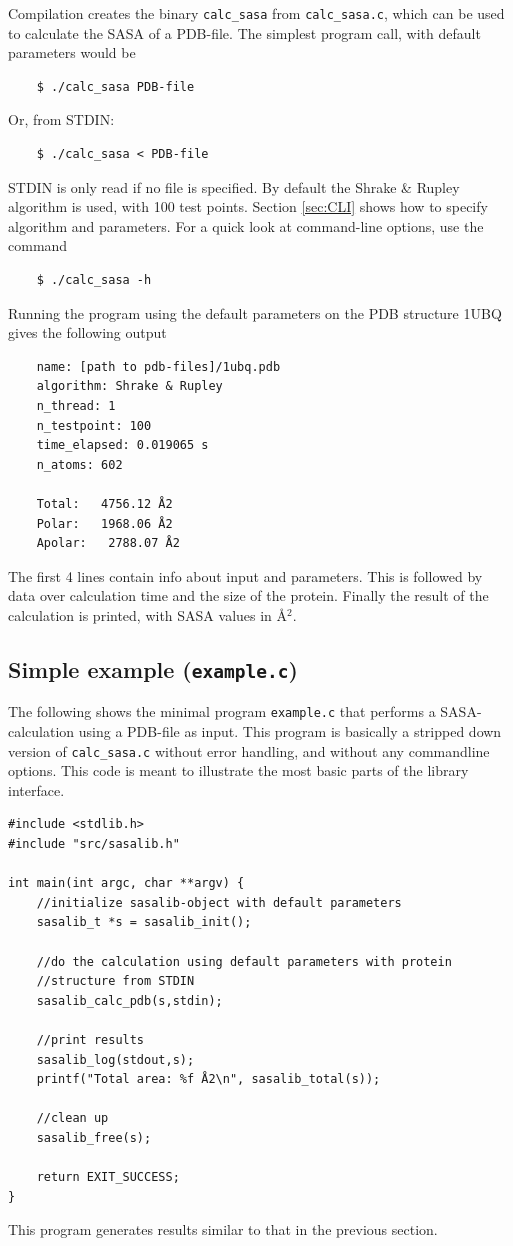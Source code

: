 \documentclass[a4paper,11pt]{article}
\begin{document}
Compilation creates the binary \texttt{calc\_sasa} from
\texttt{calc\_sasa.c}, which can be used to calculate the SASA of a
PDB-file. The simplest program call, with default parameters would be
\begin{verbatim}
    $ ./calc_sasa PDB-file
\end{verbatim}
Or, from STDIN:
\begin{verbatim} 
    $ ./calc_sasa < PDB-file    
\end{verbatim}
STDIN is only read if no file is specified.  By default the Shrake \&
Rupley algorithm is used, with 100 test points. Section \ref{sec:CLI}
shows how to specify algorithm and parameters. For a quick look at
command-line options, use the command
\begin{verbatim}
    $ ./calc_sasa -h
\end{verbatim}
Running the program using the default parameters on the PDB structure
1UBQ gives the following output
\begin{verbatim}
    name: [path to pdb-files]/1ubq.pdb
    algorithm: Shrake & Rupley
    n_thread: 1
    n_testpoint: 100
    time_elapsed: 0.019065 s
    n_atoms: 602

    Total:   4756.12 Å2
    Polar:   1968.06 Å2
    Apolar:   2788.07 Å2
\end{verbatim}
The first 4 lines contain info about input and parameters. This is
followed by data over calculation time and the size of the
protein. Finally the result of the calculation is printed, with SASA
values in Å$^2$.

\subsection{Simple example (\texttt{example.c})}\label{sec:simple_sample}

The following shows the minimal program \texttt{example.c} that
performs a SASA-calculation using a PDB-file as input. This program is
basically a stripped down version of \texttt{calc\_sasa.c} without
error handling, and without any commandline options. This code is
meant to illustrate the most basic parts of the library interface.
\begin{verbatim}
#include <stdlib.h>
#include "src/sasalib.h"

int main(int argc, char **argv) { 
    //initialize sasalib-object with default parameters
    sasalib_t *s = sasalib_init();

    //do the calculation using default parameters with protein
    //structure from STDIN
    sasalib_calc_pdb(s,stdin);

    //print results
    sasalib_log(stdout,s);
    printf("Total area: %f Å2\n", sasalib_total(s));

    //clean up
    sasalib_free(s);

    return EXIT_SUCCESS;
}
\end{verbatim}
This program generates results similar to that in the previous
section.
\end{document}

